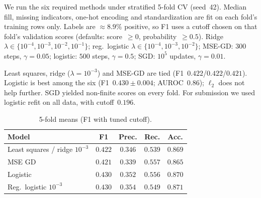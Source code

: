 

We run the six required methods under stratified 5-fold CV (seed~42).
Median fill, missing indicators, one-hot encoding and standardization are
fit on each fold's training rows only.
Labels are $\approx 8.9\%$ positive, so F1 uses a cutoff chosen on that fold's
validation scores (defaults: score~$\ge 0$, probability~$\ge 0.5$).
Ridge $\lambda\in\{10^{-4},10^{-3},10^{-2},10^{-1}\}$;
reg.\ logistic $\lambda\in\{10^{-4},10^{-3},10^{-2}\}$;
MSE-GD: $300$ steps, $\gamma{=}0.05$; logistic: $500$ steps, $\gamma{=}0.5$;
SGD: $10^{5}$ updates, $\gamma{=}0.01$.

Least squares, ridge ($\lambda{=}10^{-3}$) and MSE-GD are tied
(F1~$0.422$/$0.422$/$0.421$).
Logistic is best among the six (F1~$0.430\pm 0.004$; AUROC~$0.86$);
$\ell_2$ does not help further.
SGD yielded non-finite scores on every fold.
For submission we used logistic refit on all data, with cutoff~$0.196$.

\begin{table}[h!]
  \centering
  \caption{5-fold means (F1 with tuned cutoff).}
  \label{tab:models}
  \setlength{\tabcolsep}{3pt}
  \begin{tabular}{lcccc}
    \toprule
    Model & F1 & Prec. & Rec. & Acc. \\
    \midrule
    Least squares / ridge $10^{-3}$ & $0.422$ & $0.346$ & $0.539$ & $0.869$ \\
    MSE GD & $0.421$ & $0.339$ & $0.557$ & $0.865$ \\
    Logistic & $\mathbf{0.430}$ & $0.352$ & $0.556$ & $0.870$ \\
    Reg.\ logistic $10^{-3}$ & $0.430$ & $0.354$ & $0.549$ & $0.871$ \\
    \bottomrule
  \end{tabular}
\end{table}
